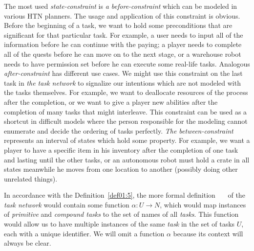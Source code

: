 \medskip\noindent
The most used \emph{state-constraint} is \emph{a before-constraint} which can be modeled in various HTN planners. The usage and application of this constraint is obvious. Before the beginning of a task, we want to hold some preconditions that are significant for that particular task. For example, a user needs to input all of the information before he can continue with the paying; a player needs to complete all of the quests before he can move on to the next stage, or a warehouse robot needs to have permission set before he can execute some real-life tasks. Analogous \emph{after-constraint} has different use cases. We might use this constraint on the last task in \emph{the task network} to signalize our intentions which are not modeled with the tasks themselves. For example, we want to deallocate resources of the process after the completion, or we want to give a player new abilities after the completion of many tasks that might interleave. This constraint can be used as a shortcut in difficult models where the person responsible for the modeling cannot enumerate and decide the ordering of tasks perfectly. \emph{The between-constraint} represents an interval of states which hold some property. For example, we want a player to have a specific item in his inventory after the completion of one task and lasting until the other tasks, or an autonomous robot must hold a crate in all states meanwhile he moves from one location to another (possibly doing other unrelated things).

\medskip\noindent
In accordance with the Definition~\ref{def01:5}, the more formal definition~\cite{complexity}~\cite{langclassification}~\cite{nau} of the \emph{task network} would contain some function $\alpha: U \rightarrow N$, which would map instances of \emph{primitive} and \emph{compound tasks} to the set of names of all \emph{tasks}. This function would allow us to have multiple instances of the same \emph{task} in the set of tasks $U$, each with a unique identifier. We will omit a function $\alpha$ because its context will always be clear.

